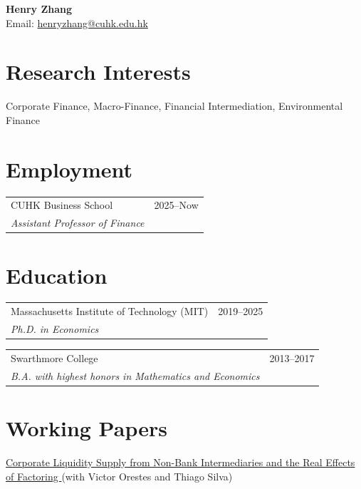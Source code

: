 \documentclass[12pt, a4paper]{article}
\makeatletter
\newcommand{\entry}[3]{%
  \noindent
  \begin{tabular*}{\textwidth}{@{\extracolsep{\fill}} p{0.8\textwidth} r}
    #1 & {\small #2} \\
    \emph{#3} &
  \end{tabular*}%
  \vspace{0.3em}
}
\makeatother
\begin{document}
{\LARGE \textbf{Henry Zhang}} \\[0.2cm]
Email: {\color{oxfordblue}\href{mailto:henryzhang@cuhk.edu.hk}{henryzhang@cuhk.edu.hk}} \\
\vspace{-1.5em}

\section*{Research Interests}
Corporate Finance, Macro-Finance, Financial Intermediation, Environmental Finance

\section*{Employment}
\entry{CUHK Business School}{2025–Now}{Assistant Professor of Finance}

\vspace{-5mm}
\section*{Education}
\entry{Massachusetts Institute of Technology (MIT)}{2019–2025}{Ph.D. in Economics}
\entry{Swarthmore College}{2013–2017}{B.A. with highest honors in Mathematics and Economics}

\vspace{-5mm}
\section*{Working Papers}
{\color{oxfordblue}
\noindent \href{https://henryhzhang.com/files/Factoring.pdf}{Corporate Liquidity Supply from Non-Bank Intermediaries and the Real Effects of Factoring }
}
(with Victor Orestes and Thiago Silva) 
\end{document}
